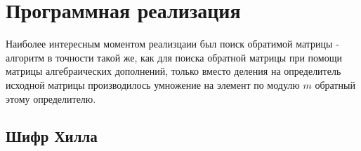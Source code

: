 \documentclass[a4paper]{article}
\begin{document}
  \newpage
  \section{Программная реализация}

  Наиболее интересным моментом реализцаии был поиск обратимой матрицы - алгоритм в точности такой же,
  как для поиска обратной матрицы при помощи матрицы алгебраических дополнений, только вместо деления
  на определитель исходной матрицы производилось умножение на элемент по модулю $m$ обратный этому определителю.

  \subsection{Шифр Хилла}

  \begin{figure}[H]
    \begin{minipage}{0.3\textwidth}
        \centering

\end{minipage}
\end{figure}
\end{document}
